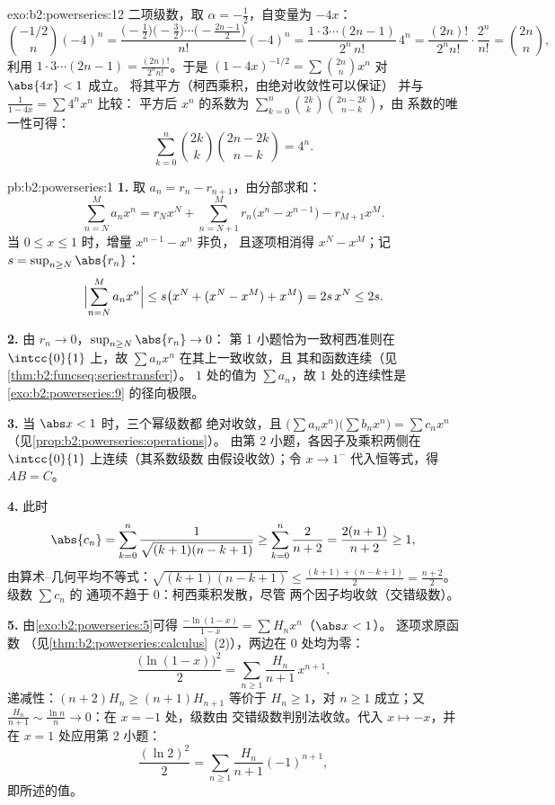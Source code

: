 \begin{solution}{exo:b2:powerseries:12}
二项级数，取 $\alpha = -\frac12$，自变量为 $-4x$：
\[
\binom{-1/2}{n}(-4)^n
= \frac{\bigl(-\frac12\bigr)\bigl(-\frac32\bigr)\cdots
\bigl(-\frac{2n-1}2\bigr)}{n!}(-4)^n
= \frac{1\cdot3\cdots(2n-1)}{2^n\,n!}\,4^n
= \frac{(2n)!}{2^n n!}\cdot\frac{2^n}{n!}
= \binom{2n}{n},
\]
利用 $1\cdot3\cdots(2n-1) = \frac{(2n)!}{2^nn!}$。于是
$(1-4x)^{-1/2} = \sum\binom{2n}nx^n$ 对 $\abs{4x} < 1$ 成立。
将其平方（柯西乘积，由绝对收敛性可以保证）
并与 $\frac{1}{1-4x} = \sum 4^nx^n$ 比较：
平方后 $x^n$ 的系数为
$\sum_{k=0}^n\binom{2k}k\binom{2n-2k}{n-k}$，由
系数的唯一性可得：
\[
\sum_{k=0}^{n}\binom{2k}{k}\binom{2n-2k}{n-k} = 4^n .
\]
\end{solution}

\begin{solution}{pb:b2:powerseries:1}
\textbf{1.} 取 $a_n = r_n - r_{n+1}$，由分部求和：
\[
\sum_{n=N}^{M} a_nx^n
= r_Nx^N + \sum_{n=N+1}^{M} r_n\bigl(x^n - x^{n-1}\bigr)
- r_{M+1}x^M .
\]
当 $0 \leq x \leq 1$ 时，增量 $x^{n-1} - x^n$ 非负，
且逐项相消得 $x^N - x^M$；记 $s = \sup_{n\geq
N}\abs{r_n}$：
\[
\Bigl|\sum_{n=N}^{M}a_nx^n\Bigr|
\leq s\bigl(x^N + (x^N - x^M) + x^M\bigr) = 2s\,x^N \leq 2s .
\]

\textbf{2.} 由 $r_n \to 0$，$\sup_{n\geq N}\abs{r_n} \to 0$：
第 1 小题恰为一致柯西准则在
$\intcc{0}{1}$ 上，故 $\sum a_nx^n$ 在其上一致收敛，且
其和函数连续（见\cref{thm:b2:funcseq:seriestransfer}）。
$1$ 处的值为 $\sum a_n$，故 $1$ 处的连续性是
\cref{exo:b2:powerseries:9} 的径向极限。

\textbf{3.} 当 $\abs x < 1$ 时，三个幂级数都
绝对收敛，且 $\bigl(\sum a_nx^n\bigr)\bigl(\sum b_nx^n\bigr)
= \sum c_nx^n$（见\cref{prop:b2:powerseries:operations}）。
由第 2 小题，各因子及乘积两侧在
$\intcc{0}{1}$ 上连续（其系数级数
由假设收敛）；令 $x \to 1^-$ 代入恒等式，得 $AB = C$。

\textbf{4.} 此时
\[
\abs{c_n} = \sum_{k=0}^{n}
\frac{1}{\sqrt{(k+1)(n-k+1)}}
\geq \sum_{k=0}^{n}\frac{2}{n+2}
= \frac{2(n+1)}{n+2} \geq 1,
\]
由算术--几何平均不等式：$\sqrt{(k+1)(n-k+1)} \leq \frac{(k+1) +
(n-k+1)}{2} = \frac{n+2}{2}$。级数 $\sum c_n$ 的
通项不趋于 $0$：柯西乘积发散，尽管
两个因子均收敛（交错级数）。

\textbf{5.} 由\cref{exo:b2:powerseries:5}可得
$\frac{-\ln(1-x)}{1-x} = \sum H_nx^n$（$\abs x < 1$）。
逐项求原函数
（见\cref{thm:b2:powerseries:calculus}~(2)），两边在
$0$ 处均为零：
\[
\frac{\bigl(\ln(1-x)\bigr)^2}{2}
= \sum_{n\geq1}\frac{H_n}{n+1}\,x^{n+1} .
\]
递减性：$(n+2)H_n \geq (n+1)H_{n+1}$ 等价于 $H_n \geq
1$，对 $n \geq 1$ 成立；又 $\frac{H_n}{n+1} \sim \frac{\ln
n}{n} \to 0$：在 $x = -1$ 处，级数由
交错级数判别法收敛。代入 $x \mapsto -x$，并
在 $x = 1$ 处应用第 2 小题：
\[
\frac{(\ln 2)^2}{2}
= \sum_{n\geq1}\frac{H_n}{n+1}(-1)^{n+1},
\]
即所述的值。


\end{solution}
